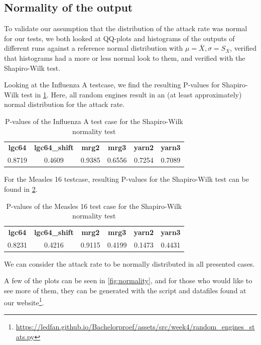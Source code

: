 \documentclass[natbib=true]{acmart}
\begin{document}
\subsection{Normality of the output}
\label{par:normality}
To validate our assumption that the distribution of the attack rate was normal for our tests, we both looked at QQ-plots and histograms of the outputs of different runs against a reference normal distribution with $\mu = \bar{X}, \sigma=S_X$, verified that histograms had a more or less normal look to them, and verified with the Shapiro-Wilk test.

Looking at the Influenza A testcase, we find the resulting P-values for Shapiro-Wilk test in \cref{tab:influenza_a:shapiro}. Here, all random engines result in an (at least approximately) normal distribution for the attack rate.
\begin{table}[!hbt]
    \begin{tabular}{c c c c c c}
       \textbf{lgc64} & \textbf{lgc64\_shift} & \textbf{mrg2} & \textbf{mrg3} & \textbf{yarn2} & \textbf{yarn3}\\
        0.8719 & 0.4609 & 0.9385 & 0.6556 & 0.7254 & 0.7089
    \end{tabular}
    \caption{P-values of the Influenza A test case for the Shapiro-Wilk normality test}
    \label{tab:influenza_a:shapiro}
\end{table}


For the Measles 16 testcase, resulting P-values for the Shapiro-Wilk test can be found in \cref{tab:measles_16:shapiro}.

\begin{table}[!hbt]
    \begin{tabular}{c c c c c c}
       \textbf{lgc64} & \textbf{lgc64\_shift} & \textbf{mrg2} & \textbf{mrg3} & \textbf{yarn2} & \textbf{yarn3}\\
        0.8231 & 0.4216 & 0.9115 & 0.4199 & 0.1473 & 0.4431
    \end{tabular}
    \caption{P-values of the Measles 16 test case for the Shapiro-Wilk normality test}
    \label{tab:measles_16:shapiro}
\end{table}

We can consider the attack rate to be normally distributed in all presented cases.

A few of the plots can be seen in \cref{fig:normality}, and for those who would like to see more of them, they can be generated with the script and datafiles found at our website\footnote{\url{https://ledfan.github.io/Bachelorproef/assets/src/week4/random\_engines\_stats.py}}.
\end{document}
